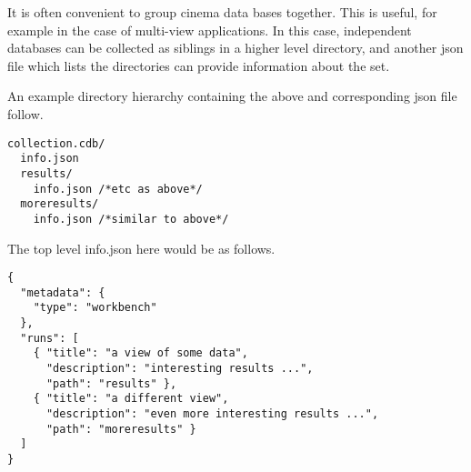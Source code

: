 \label{sec:multiview}

It is often convenient to group cinema data bases together. This is useful, for example in the case of multi-view applications. In this case, independent databases can be collected as siblings in a higher level directory, and another json file which lists the directories can provide information about the set.

An example directory hierarchy containing the above and corresponding json file follow.

\begin{verbatim}
collection.cdb/
  info.json
  results/
    info.json /*etc as above*/
  moreresults/
    info.json /*similar to above*/
\end{verbatim}

The top level info.json here would be as follows.

\begin{verbatim}
{
  "metadata": {
    "type": "workbench"
  },
  "runs": [
    { "title": "a view of some data",
      "description": "interesting results ...",
      "path": "results" },
    { "title": "a different view",
      "description": "even more interesting results ...",
      "path": "moreresults" }
  ]
}
\end{verbatim}
